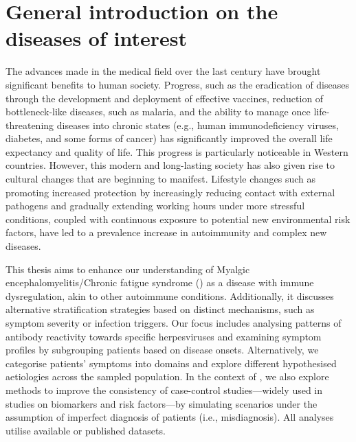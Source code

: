 \chapter{General introduction on the diseases of interest}
\label{chapter:introduction}

The advances made in the medical field over the last century have brought significant benefits to human society. Progress, such as the eradication of diseases through the development and deployment of effective vaccines, reduction of bottleneck-like diseases, such as malaria, and the ability to manage once life-threatening diseases into chronic states (e.g., human immunodeficiency viruses, diabetes, and some forms of cancer) has significantly improved the overall life expectancy and quality of life. This progress is particularly noticeable in Western countries. However, this modern and long-lasting society has also given rise to cultural changes that are beginning to manifest. Lifestyle changes such as promoting increased protection by increasingly reducing contact with external pathogens and gradually extending working hours under more stressful conditions, coupled with continuous exposure to potential new environmental risk factors, have led to a prevalence increase in autoimmunity and complex new diseases.

This thesis aims to enhance our understanding of Myalgic encephalomyelitis/Chronic fatigue syndrome (\cfs) as a disease with immune dysregulation, akin to other autoimmune conditions. Additionally, it discusses alternative stratification strategies based on distinct mechanisms, such as symptom severity or infection triggers. Our focus includes analysing patterns of antibody reactivity towards specific herpesviruses and examining symptom profiles by subgrouping patients based on disease onsets. Alternatively, we categorise patients' symptoms into domains and explore different hypothesised aetiologies across the sampled population. In the context of \cfs, we also explore methods to improve the consistency of case-control studies---widely used in studies on biomarkers and risk factors---by simulating scenarios under the assumption of imperfect diagnosis of \cfs patients (i.e., misdiagnosis). All analyses utilise available or published datasets.

